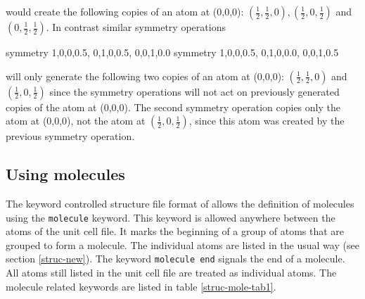 would create the following copies of an atom at (0,0,0):
$(\frac{1}{2}, \frac{1}{2}, 0), (\frac{1}{2}, 0, \frac{1}{2})$ and
$(0, \frac{1}{2}, \frac{1}{2})$.  In contrast similar symmetry
operations

\begin{MacVerbatim}
    symmetry 1,0,0,0.5, 0,1,0,0.5, 0,0,1,0.0
    symmetry 1,0,0,0.5, 0,1,0,0.0, 0,0,1,0.5
\end{MacVerbatim}

will only generate the following two copies of an atom at (0,0,0):
$(\frac{1}{2}, \frac{1}{2}, 0)$ and $(\frac{1}{2}, 0, \frac{1}{2})$
since the symmetry operations will not act on previously generated
copies of the atom at (0,0,0). The second symmetry operation copies
only the atom at (0,0,0), not the atom at $(\frac{1}{2}, 0,
\frac{1}{2})$, since this atom was created by the previous symmetry
operation.


\subsection{Using molecules \label{mol}}

The keyword controlled structure file format of \Discus allows
the definition of molecules using the {\tt molecule} keyword.  This
keyword is allowed anywhere between the atoms of the unit cell file.
It marks the beginning of a group of atoms that are grouped to form
a molecule.  The individual atoms are listed in the usual way (see
section \ref{struc-new}).  The keyword {\tt molecule end} signals
the end of a molecule.  All atoms still listed in the unit cell file
are treated as individual atoms.  The molecule related keywords are
listed in table \ref{struc-mole-tab1}.

